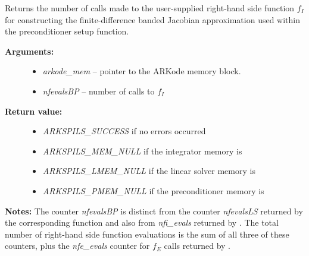 \documentclass[letterpaper,10pt,english]{sphinxmanual}
\begin{document}

\begin{fulllineitems}
\label{c_interface/Preconditioners:ARKBandPrecGetNumRhsEvals}
Returns the number of calls made to the user-supplied
right-hand side function $f_I$ for constructing the
finite-difference banded Jacobian approximation used within the
preconditioner setup function.
\begin{description}
\item[{\textbf{Arguments:}}] \leavevmode\begin{itemize}
\item {} 
\emph{arkode\_mem} -- pointer to the ARKode memory block.

\item {} 
\emph{nfevalsBP} -- number of calls to $f_I$

\end{itemize}

\item[{\textbf{Return value:}}] \leavevmode\begin{itemize}
\item {} 
\emph{ARKSPILS\_SUCCESS} if no errors occurred

\item {} 
\emph{ARKSPILS\_MEM\_NULL} if the integrator memory is 

\item {} 
\emph{ARKSPILS\_LMEM\_NULL} if the linear solver memory is 

\item {} 
\emph{ARKSPILS\_PMEM\_NULL} if the preconditioner memory is 

\end{itemize}

\end{description}

\textbf{Notes:}  The counter \emph{nfevalsBP} is distinct from the counter
\emph{nfevalsLS} returned by the corresponding function
{\hyperref[c_interface/User_callable:ARKSpilsGetNumRhsEvals]{}} and also from \emph{nfi\_evals} returned by
{\hyperref[c_interface/User_callable:ARKodeGetNumRhsEvals]{}}.  The total number of right-hand
side function evaluations is the sum of all three of these
counters, plus the \emph{nfe\_evals} counter for $f_E$ calls
returned by {\hyperref[c_interface/User_callable:ARKodeGetNumRhsEvals]{}}.

\end{fulllineitems}
\end{document}
